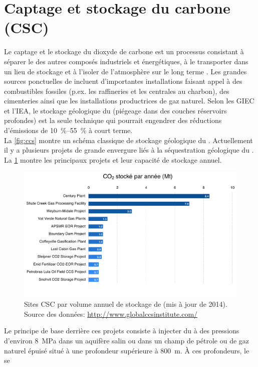 \section{Captage et stockage du carbone (CSC)}
Le captage et le stockage du dioxyde de carbone est un processus consistant à
séparer le  des autres composés industriels et énergétiques, à le
transporter dans un lieu de stockage et à l'isoler de l'atmosphère sur le long
terme \citep{IPCC2005}. Les grandes sources ponctuelles de  incluent
d'importantes installations faisant appel à des combustibles fossiles (p.ex. les
raffineries et les centrales au charbon), des cimenteries ainsi que les
installations productrices de gaz naturel. Selon les GIEC et l'IEA, le stockage
géologique du  (piégeage dans des couches réservoirs profondes) est la
seule
technique qui pourrait engendrer des réductions d'émissions de
\SIrange{10}{55}{\percent} à court terme. \\
La \cref{fig:ccs} montre un schéma classique de stockage géologique du
. Actuellement il y a plusieurs projets de grande envergure liés à la
séquestration géologique du . La \cref{fig:ccs_sites} montre les
principaux projets et leur capacité de stockage annuel.
\begin{figure}[ht]
\centering
\includegraphics[width=1\textwidth]{fig/CCS_sites.pdf}
\caption{Sites CSC par volume annuel de stockage de  (mis à jour de
2014). Source des données: \url{http://www.globalccsinstitute.com/}}
\label{fig:ccs_sites}
\end{figure}
Le principe de base derrière ces projets consiste à injecter du   à des
pressions d'environ \SI{8}{\mega\pascal} dans un
aquifère salin ou dans un champ de pétrole ou de gaz naturel épuisé situé à une
profondeur supérieure à \SI{800}{\metre}. À ces profondeurs, le  se
